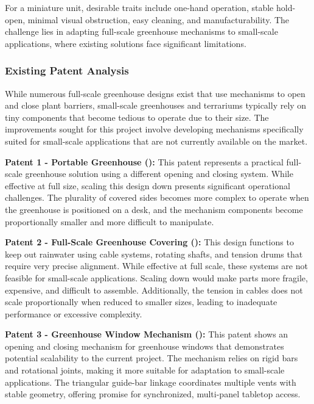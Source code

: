 \documentclass[12pt]{article}
\begin{document}
For a miniature unit, desirable traits include one-hand operation, stable hold-open, minimal visual obstruction, easy cleaning, and manufacturability. The challenge lies in adapting full-scale greenhouse mechanisms to small-scale applications, where existing solutions face significant limitations.

\subsubsection{Existing Patent Analysis}
\label{sec:patent_analysis}

While numerous full-scale greenhouse designs exist that use mechanisms to open and close plant barriers, small-scale greenhouses and terrariums typically rely on tiny components that become tedious to operate due to their size. The improvements sought for this project involve developing mechanisms specifically suited for small-scale applications that are not currently available on the market.

\textbf{Patent 1 - Portable Greenhouse (\cite{Koziol1974}):} This patent represents a practical full-scale greenhouse solution using a different opening and closing system. While effective at full size, scaling this design down presents significant operational challenges. The plurality of covered sides becomes more complex to operate when the greenhouse is positioned on a desk, and the mechanism components become proportionally smaller and more difficult to manipulate.

\textbf{Patent 2 - Full-Scale Greenhouse Covering (\cite{Jaderloon1999}):} This design functions to keep out rainwater using cable systems, rotating shafts, and tension drums that require very precise alignment. While effective at full scale, these systems are not feasible for small-scale applications. Scaling down would make parts more fragile, expensive, and difficult to assemble. Additionally, the tension in cables does not scale proportionally when reduced to smaller sizes, leading to inadequate performance or excessive complexity.

\textbf{Patent 3 - Greenhouse Window Mechanism (\cite{Bom1978}):} This patent shows an opening and closing mechanism for greenhouse windows that demonstrates potential scalability to the current project. The mechanism relies on rigid bars and rotational joints, making it more suitable for adaptation to small-scale applications. The triangular guide-bar linkage coordinates multiple vents with stable geometry, offering promise for synchronized, multi-panel tabletop access.
\end{document}

